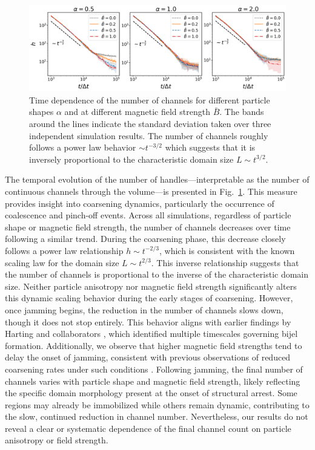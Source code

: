 \begin{figure}
    \centering
\includegraphics[scale=0.45]{../figures/results/paper1_5/handles_time.png}%
\caption{Time dependence of the number of channels for different particle shapes $\alpha$ and at different magnetic field strength $\bar{B}$. 
         The bands around the lines indicate the standard deviation taken over three independent simulation results. The number of channels roughly 
         follows a power law behavior $\sim t^{-3/2}$ which suggests that it is inversely proportional to the characteristic domain size $L \sim t^{3/2}$.
\label{fig:handles_time}}%
\end{figure}

The temporal evolution of the number of handles—interpretable as the number of continuous channels through the volume—is presented in Fig.~\ref{fig:handles_time}. This measure provides insight 
into coarsening dynamics, particularly the occurrence of coalescence and pinch-off events. Across all simulations, regardless of particle shape or magnetic field strength, the number of channels 
decreases over time following a similar trend. During the coarsening phase, this decrease closely follows a power law relationship \(h \sim t^{-2/3}\), which is consistent with the known scaling 
law for the domain size \(L \sim t^{2/3}\). This inverse relationship suggests that the number of channels is proportional to the inverse of the characteristic domain size. 
Neither particle anisotropy nor magnetic field strength significantly alters this dynamic scaling behavior during the early stages of coarsening. However, once jamming begins, the reduction in the 
number of channels slows down, though it does not stop entirely. This behavior aligns with earlier findings by Harting and collaborators \cite{gunther_timescales_2014}, which identified multiple 
timescales governing bijel formation. Additionally, we observe that higher magnetic field strengths tend to delay the onset of jamming, consistent with previous observations of reduced coarsening 
rates under such conditions \cite{karthikeyan_formation_2024}.
Following jamming, the final number of channels varies with particle shape and magnetic field strength, likely reflecting the specific domain morphology present at the onset of structural arrest. 
Some regions may already be immobilized while others remain dynamic, contributing to the slow, continued reduction in channel number. Nevertheless, our results do not reveal a clear or systematic 
dependence of the final channel count on particle anisotropy or field strength.

